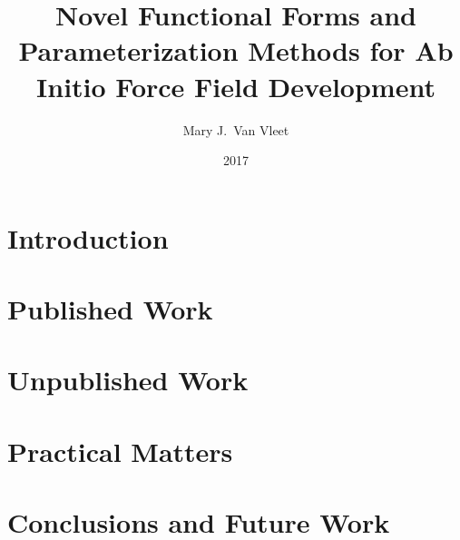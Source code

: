 \documentclass[12pt,oneside,letterpaper]{memoir}
\title{
Novel Functional Forms and Parameterization Methods for Ab Initio Force Field Development
}
\author{Mary J.~Van Vleet}
\date{2017}
\begin{document}

\ifpdf
{}
\else
{}
\fi

\maketitle
\restoregeometry %




\part{Introduction}
\glsresetall %



\part{Published Work}
\glsresetall 

\glsresetall 


\part{Unpublished Work}
\glsresetall 

\glsresetall 


\part{Practical Matters}



\part{Conclusions and Future Work}


\end{document}
